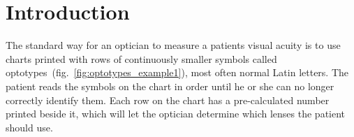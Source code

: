 \documentclass[12pt,a4paper,notitlepage]{report}
\begin{document}
\renewcommand\thechapter{\arabic{chapter}}
\setcounter{page}{1}
\chapter{ Introduction}
The standard way for an optician to measure a patients visual acuity is to use charts printed with rows of continuously smaller symbols called optotypes~(fig.~\ref{fig:optotypes_example1}), most often normal Latin letters. The patient reads the symbols on the chart in order until he or she can no longer correctly identify them. Each row on the chart has a pre-calculated number printed beside it, which will let the optician determine which lenses the patient should use.
\end{document}
